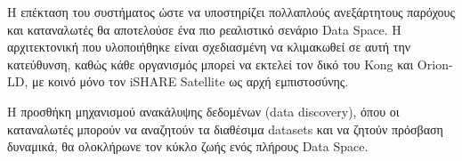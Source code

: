 Η επέκταση του συστήματος ώστε να υποστηρίζει πολλαπλούς ανεξάρτητους
παρόχους και καταναλωτές θα αποτελούσε ένα πιο ρεαλιστικό σενάριο
\textlatin{Data Space}. Η αρχιτεκτονική που υλοποιήθηκε είναι σχεδιασμένη
να κλιμακωθεί σε αυτή την κατεύθυνση, καθώς κάθε οργανισμός μπορεί να
εκτελεί τον δικό του \textlatin{Kong} και \textlatin{Orion-LD}, με κοινό
μόνο τον \textlatin{iSHARE Satellite} ως αρχή εμπιστοσύνης.

Η προσθήκη μηχανισμού ανακάλυψης δεδομένων (\textlatin{data discovery}),
όπου οι καταναλωτές μπορούν να αναζητούν τα διαθέσιμα \textlatin{datasets}
και να ζητούν πρόσβαση δυναμικά, θα ολοκλήρωνε τον κύκλο ζωής ενός
πλήρους \textlatin{Data Space}.

